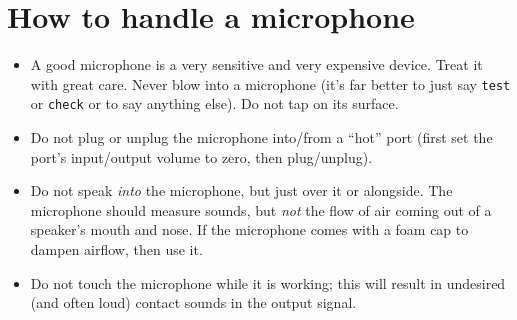 \documentclass[
]{book}
\begin{document}
\label{mic-howto}
\section{How to handle a microphone}\label{sec:microphone}

\begin{itemize}
\item
  A good microphone is a very sensitive and very expensive device. Treat it with great care. Never blow into a microphone (it's far better to just say \texttt{test} or \texttt{check} or to say anything else). Do not tap on its surface.
\item
  Do not plug or unplug the microphone into/from a ``hot'' port (first set the port's input/output volume to zero, then plug/unplug).
\item
  Do not speak \emph{into} the microphone, but just over it or alongside. The microphone should measure sounds, but \emph{not} the flow of air coming out of a speaker's mouth and nose. If the microphone comes with a foam cap to dampen airflow, then use it.
\item
  Do not touch the microphone while it is working; this will result in undesired (and often loud) contact sounds in the output signal.
\end{itemize}

  
\end{document}
